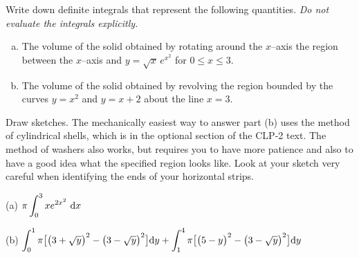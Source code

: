 
\begin{question}[2000D]  %
Write down definite integrals that represent the following quantities.
\emph{Do not evaluate the integrals explicitly.}
\begin{enumerate}[(a)]
\item
The volume of the solid obtained by rotating  around the $x$--axis the
region between the $x$--axis and $y=\sqrt{x}\, e^{x^2}$ for $0\le x\le 3$.
\item
The volume of the solid obtained by revolving the
region bounded by the curves $y=x^2$ and $y=x+2$ about the line $x=3$.
\end{enumerate}
\end{question}

\begin{hint}
Draw sketches.
The mechanically easiest way to answer part (b) uses the method of cylindrical
shells, which is in the optional section 
                of the CLP-2 text.  The method of washers also works, but requires  you to have more patience and also
to have a good idea what the specified region looks like.  Look at your sketch
very careful when identifying the ends of your horizontal strips.
\end{hint}

\begin{answer} (a)
$\pi\displaystyle\int_{0}^{3} xe^{2x^2}\ \mathrm{d}x$

\noindent (b)
$\displaystyle\int _0^1  \pi\big[\big(3+\sqrt{y}\big)^2-\big(3-\sqrt{y}\big)^2\big]\mathrm{d}y
+\displaystyle\int _ 1^4  \pi\big[\big(5-y\big)^2-\big(3-\sqrt{y}\big)^2\big]\mathrm{d}y$

\end{answer}

